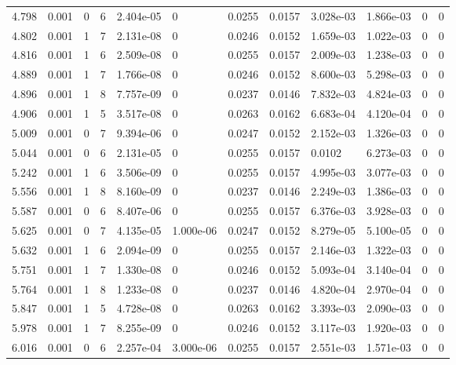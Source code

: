 \documentclass[preview]{standalone}
\begin{document}
{{{\begin{tabular}{L{1.2cm}C{1.2cm} C{0.3cm}C{0.5cm} C{1.4cm}C{1.4cm} C{1.4cm}C{1.4cm} C{1.6cm}C{1.6cm} C{1.6cm}C{1.6cm}}
  4.798  &  0.001  & 0     &  6 &  2.404e-05  & 0  &  0.0255&   0.0157& 3.028e-03 & 1.866e-03   &  0 & 0  \\ 
  4.802  &  0.001  & 1     &  7 &  2.131e-08  & 0  &  0.0246&   0.0152& 1.659e-03 & 1.022e-03   &  0 & 0  \\ 
  4.816  &  0.001  & 1     &  6 &  2.509e-08  & 0  &  0.0255&   0.0157& 2.009e-03 & 1.238e-03   &  0 & 0  \\ 
  4.889  &  0.001  & 1     &  7 &  1.766e-08  & 0  &  0.0246&   0.0152& 8.600e-03 & 5.298e-03   &  0 & 0  \\ 
  4.896  &  0.001  & 1     &  8 &  7.757e-09  & 0  &  0.0237&   0.0146& 7.832e-03 & 4.824e-03   &  0 & 0  \\ 
  4.906  &  0.001  & 1     &  5 &  3.517e-08  & 0  &  0.0263&   0.0162& 6.683e-04 & 4.120e-04   &  0 & 0  \\ 
  5.009  &  0.001  & 0     &  7 &  9.394e-06  & 0  &  0.0247&   0.0152& 2.152e-03 & 1.326e-03   &  0 & 0  \\ 
  5.044  &  0.001  & 0     &  6 &  2.131e-05  & 0  &  0.0255&   0.0157& 0.0102 & 6.273e-03   &  0 & 0  \\ 
  5.242  &  0.001  & 1     &  6 &  3.506e-09  & 0  &  0.0255&   0.0157& 4.995e-03 & 3.077e-03   &  0 & 0  \\ 
  5.556  &  0.001  & 1     &  8 &  8.160e-09  & 0  &  0.0237&   0.0146& 2.249e-03 & 1.386e-03   &  0 & 0  \\ 
  5.587  &  0.001  & 0     &  6 &  8.407e-06  & 0  &  0.0255&   0.0157& 6.376e-03 & 3.928e-03   &  0 & 0  \\ 
  5.625  &  0.001  & 0     &  7 &  4.135e-05  & 1.000e-06  &  0.0247&   0.0152& 8.279e-05 & 5.100e-05   &  0 & 0  \\ 
  5.632  &  0.001  & 1     &  6 &  2.094e-09  & 0  &  0.0255&   0.0157& 2.146e-03 & 1.322e-03   &  0 & 0  \\ 
  5.751  &  0.001  & 1     &  7 &  1.330e-08  & 0  &  0.0246&   0.0152& 5.093e-04 & 3.140e-04   &  0 & 0  \\ 
  5.764  &  0.001  & 1     &  8 &  1.233e-08  & 0  &  0.0237&   0.0146& 4.820e-04 & 2.970e-04   &  0 & 0  \\ 
  5.847  &  0.001  & 1     &  5 &  4.728e-08  & 0  &  0.0263&   0.0162& 3.393e-03 & 2.090e-03   &  0 & 0  \\ 
  5.978  &  0.001  & 1     &  7 &  8.255e-09  & 0  &  0.0246&   0.0152& 3.117e-03 & 1.920e-03   &  0 & 0  \\ 
  6.016  &  0.001  & 0     &  6 &  2.257e-04  & 3.000e-06  &  0.0255&   0.0157& 2.551e-03 & 1.571e-03   &  0 & 0  \\ 

\end{tabular}}}}
\end{document}
